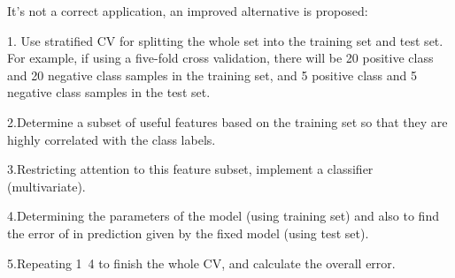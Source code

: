 \documentclass[22pt]{article}
\begin{document}
	It's not a correct application, an improved alternative is proposed:

	1. Use stratified CV for splitting the whole set into the training set and test set. For example, if using a five-fold cross validation, there will be 20 positive class and 20 negative class samples in the training set, and 5 positive class and 5 negative class samples in the test set.

	2.Determine a subset of useful features based on the training set so that they are highly correlated with the class labels.

	3.Restricting attention to this feature subset, implement a classifier (multivariate).

	4.Determining the parameters of the model (using training set) and also to find the error of in prediction given by the fixed model (using test set).

	5.Repeating 1~4 to finish the whole CV, and calculate the overall error.
\end{document}

